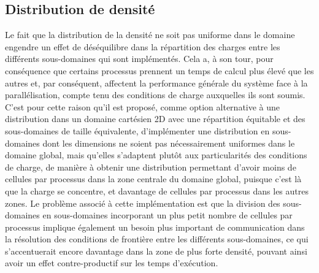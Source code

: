 \subsection{Distribution de densité}
Le fait que la distribution de la densité ne soit pas uniforme dans le domaine engendre un effet de déséquilibre dans la répartition des charges entre les différents sous-domaines qui sont implémentés. Cela a, à son tour, pour conséquence que certains processus prennent un temps de calcul plus élevé que les autres et, par conséquent, affectent la performance générale du système face à la parallélisation, compte tenu des conditions de charge auxquelles ils sont soumis. C’est pour cette raison qu’il est proposé, comme option alternative à une distribution dans un domaine cartésien 2D avec une répartition équitable et des sous-domaines de taille équivalente, d’implémenter une distribution en sous-domaines dont les dimensions ne soient pas nécessairement uniformes dans le domaine global, mais qu’elles s’adaptent plutôt aux particularités des conditions de charge, de manière à obtenir une distribution permettant d’avoir moins de cellules par processus dans la zone centrale du domaine global, puisque c’est là que la charge se concentre, et davantage de cellules par processus dans les autres zones. Le problème associé à cette implémentation est que la division des sous-domaines en sous-domaines incorporant un plus petit nombre de cellules par processus implique également un besoin plus important de communication dans la résolution des conditions de frontière entre les différents sous-domaines, ce qui s’accentuerait encore davantage dans la zone de plus forte densité, pouvant ainsi avoir un effet contre-productif sur les temps d’exécution.
